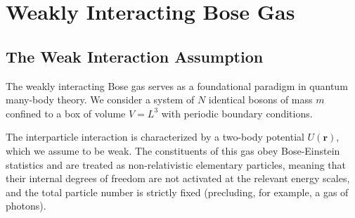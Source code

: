 \chapter{Weakly Interacting Bose Gas}

\section{The Weak Interaction Assumption}

The weakly interacting Bose gas serves as a foundational paradigm in quantum many-body theory. We consider a system of \( N \) identical bosons of mass \( m \) confined to a box of volume \( V = L^3 \) with periodic boundary conditions.

The interparticle interaction is characterized by a two-body potential \( U(\mathbf{r}) \), which we assume to be weak. The constituents of this gas obey Bose-Einstein statistics and are treated as non-relativistic elementary particles, meaning that their internal degrees of freedom are not activated at the relevant energy scales, and the total particle number is strictly fixed (precluding, for example, a gas of photons).


